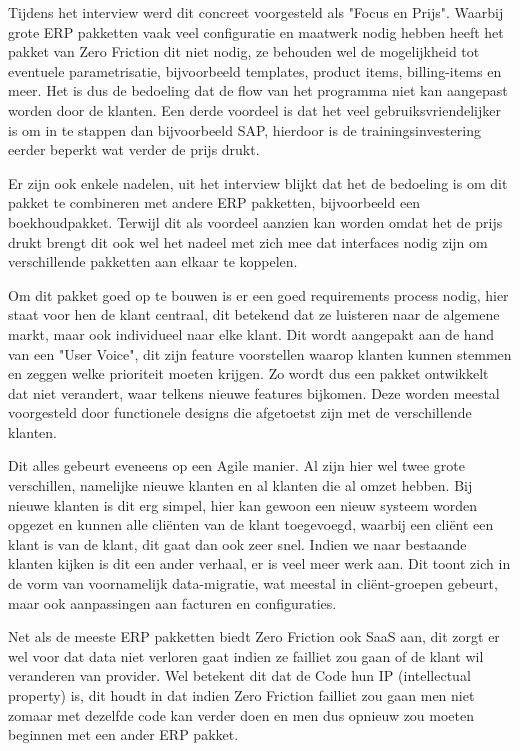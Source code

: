 Tijdens het interview werd dit concreet voorgesteld als "Focus en Prijs". Waarbij grote ERP pakketten vaak veel configuratie en maatwerk nodig hebben heeft het pakket van Zero Friction dit niet nodig, ze behouden wel de mogelijkheid tot eventuele parametrisatie, bijvoorbeeld templates, product items, billing-items en meer. Het is dus de bedoeling dat de flow van het programma niet kan aangepast worden door de klanten. Een derde voordeel is dat het veel gebruiksvriendelijker is om in te stappen dan bijvoorbeeld SAP, hierdoor is de trainingsinvestering eerder beperkt wat verder de prijs drukt.

Er zijn ook enkele nadelen, uit het interview blijkt dat het de bedoeling is om dit pakket te combineren met andere ERP pakketten, bijvoorbeeld een boekhoudpakket. Terwijl dit als voordeel aanzien kan worden omdat het de prijs drukt brengt dit ook wel het nadeel met zich mee dat interfaces nodig zijn om verschillende pakketten aan elkaar te koppelen.

Om dit pakket goed op te bouwen is er een goed requirements process nodig, hier staat voor hen de klant centraal, dit betekend dat ze luisteren naar de algemene markt, maar ook individueel naar elke klant. Dit wordt aangepakt aan de hand van een "User Voice", dit zijn feature voorstellen waarop klanten kunnen stemmen en zeggen welke prioriteit moeten krijgen. Zo wordt dus een pakket ontwikkelt dat niet verandert, waar telkens nieuwe features bijkomen. Deze worden meestal voorgesteld door functionele designs die afgetoetst zijn met de verschillende klanten. 

Dit alles gebeurt eveneens op een Agile manier. Al zijn hier wel twee grote verschillen, namelijke nieuwe klanten en al klanten die al omzet hebben. Bij nieuwe klanten is dit erg simpel, hier kan gewoon een nieuw systeem worden opgezet en kunnen alle cliënten van de klant toegevoegd, waarbij een cliënt een klant is van de klant, dit gaat dan ook zeer snel. Indien we naar bestaande klanten kijken is dit een ander verhaal, er is veel meer werk aan. Dit toont zich in de vorm van voornamelijk data-migratie, wat meestal in cliënt-groepen gebeurt, maar ook aanpassingen aan facturen en configuraties.

Net als de meeste ERP pakketten biedt Zero Friction ook SaaS aan, dit zorgt er wel voor dat data niet verloren gaat indien ze failliet zou gaan of de klant wil veranderen van provider. Wel betekent dit dat de Code hun IP (intellectual property) is, dit houdt in dat indien Zero Friction failliet zou gaan men niet zomaar met dezelfde code kan verder doen en men dus opnieuw zou moeten beginnen met een ander ERP pakket.
